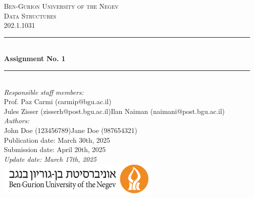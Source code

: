 \documentclass[a4paper]{article}
\theoremstyle{remarksStyle}
\theoremstyle{questionStyle}
\theoremstyle{answerStyle}
\begin{document}
\begin{titlepage}

\newcommand{\HRule}{\rule{\linewidth}{0.5mm}} 							%
\center 
 
\textsc{\LARGE Ben-Gurion University of the Negev}\\[1cm]

\textsc{\Large Data Structures}\\[0.2cm]
\textsc{\large 202.1.1031}\\[1cm] 										%
\HRule \\[0.8cm]
{ \huge \bfseries Assignment No. 1}\\[0.7cm]								%
\HRule \\[2cm]
\large
\emph{Responsible staff members:}\\
{Prof. Paz Carmi} (carmip@bgu.ac.il)\\
Jules Zisser (zisserh@post.bgu.ac.il)\quad\quad Ilan Naiman (naimani@post.bgu.ac.il)\\[1.5cm]		
\emph{Authors:}\\
John Doe (123456789)\quad Jane Doe (987654321)\\[1.5cm]
{\large Publication date: March 30th, 2025}\\
{\large Submission date: April 20th, 2025}\\[1cm]
{\large \it Update date: March 17th, 2025}\\[5cm]
\includegraphics[width=0.6\textwidth]{BGU-Icon.png}\\[1cm] 	%
\vfill 
\end{titlepage}
\newpage
\end{document}
